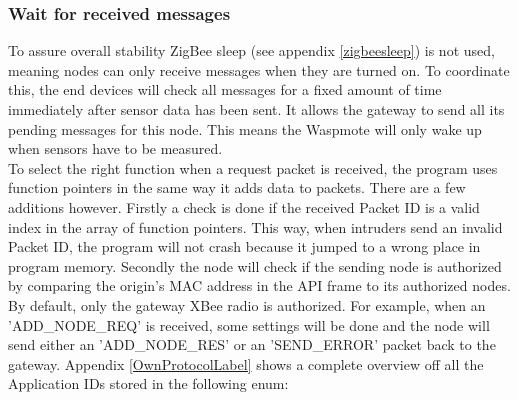 \subsubsection{Wait for received messages}
To assure overall stability ZigBee sleep (see appendix \ref{zigbeesleep}) is not used, meaning nodes can only receive messages when they are turned on. To coordinate this, the end devices will check all messages for a fixed amount of time immediately after sensor data has been sent. It allows the gateway to send all its pending messages for this node. This means the Waspmote will only wake up when sensors have to be measured.\\
To select the right function when a request packet is received, the program uses function pointers in the same way it adds data to packets. There are a few additions however. Firstly a check is done if the received Packet ID is a valid index in the array of function pointers. This way, when intruders send an invalid Packet ID, the program will not crash because it jumped to a wrong place in program memory. Secondly the node will check if the sending node is authorized by comparing the origin's MAC address in the API frame to its authorized nodes. By default, only the gateway XBee radio is authorized.
For example, when an 'ADD\_NODE\_REQ' is received, some settings will be done and the node will send either an 'ADD\_NODE\_RES' or an 'SEND\_ERROR' packet back to the gateway. Appendix \ref{OwnProtocolLabel} shows a complete overview off all the Application IDs stored in the following enum:
